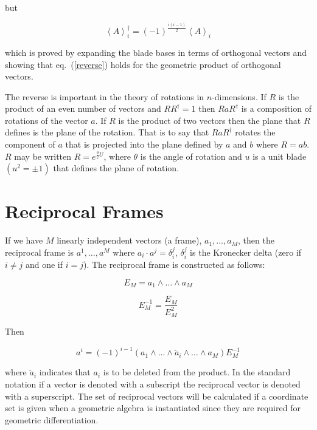 \documentclass[12pt]{report}
\newcommand{\bfrac}[2]{\displaystyle\frac{#1}{#2}}
\newcommand{\lp}{\left (}
\newcommand{\rp}{\right )}
\newcommand{\llt}{\left <}
\newcommand{\rgt}{\right >}
\newcommand{\W}{\wedge}
\newcommand{\R}{\dagger}
\newcommand{\proj}[2]{\llt {#1} \rgt_{#2}}
\begin{document}
but

  \begin{equation}\label{reverse}
    \proj{A}{i}^{\R} = \lp -1\rp^{\frac{i\lp i-1\rp}{2}}\proj{A}{i}
  \end{equation}

which is proved by expanding the blade bases in terms of orthogonal vectors and
showing that eq.~(\ref{reverse}) holds for the geometric product of orthogonal
vectors.

The reverse is important in the theory of rotations in $n$-dimensions.  If
$R$ is the product of an even number of vectors and $RR^{\R} = 1$
then $RaR^{\R}$ is a composition of rotations of the vector $a$.
If $R$ is the product of two vectors then the plane that $R$ defines
is the plane of the rotation.  That is to say that $RaR^{\R}$ rotates the
component of $a$ that is projected into the plane defined by $a$ and
$b$ where $R=ab$. $R$ may be written
$R = e^{\frac{\theta}{2}U}$, where $\theta$ is the angle of rotation
and $u$ is a unit blade $\lp u^{2} = \pm 1\rp$ that defines the
plane of rotation.

\section{Reciprocal Frames}

If we have $M$ linearly independent vectors (a frame),
$a_{1},\dots,a_{M}$, then the reciprocal frame is
$a^{1},\dots,a^{M}$ where $a_{i}\cdot a^{j} = \delta_{i}^{j}$,
$\delta_{i}^{j}$ is the Kronecker delta (zero if $i \ne j$ and one
if $i = j$). The reciprocal frame is constructed as follows:

  \begin{equation}
    E_{M} = a_{1}\W\dots\W a_{M}
  \end{equation}

  \begin{equation}
    E_{M}^{-1} = \bfrac{E_{M}}{E_{M}^{2}}
  \end{equation}

Then

  \begin{equation}
    a^{i} = \lp -1\rp^{i-1}\lp a_{1}\W\dots\W \breve{a}_{i} \W\dots\W a_{M}\rp E_{M}^{-1}
  \end{equation}

where $\breve{a}_{i}$ indicates that $a_{i}$ is to be deleted from
the product.  In the standard notation if a vector is denoted with a subscript
the reciprocal vector is denoted with a superscript. The set of reciprocal vectors
will be calculated if a coordinate set is given when a geometric algebra is instantiated since 
they are required for geometric differentiation.
\end{document}
